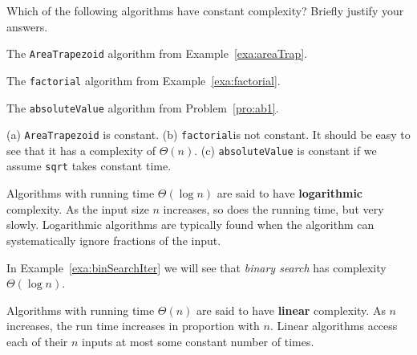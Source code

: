 \begin{exer}
Which of the following algorithms have constant complexity?   
Briefly justify your answers.
\begin{lenum}
\item
The \verb+AreaTrapezoid+ algorithm from Example~\ref{exa:areaTrap}.

\noindent
\answerlinetwo
\item
The \verb+factorial+ algorithm from Example~\ref{exa:factorial}.

\noindent
\answerlinetwo
\item 
The \verb+absoluteValue+ algorithm from Problem~\ref{pro:ab1}.

\noindent
\answerlinetwo
\end{lenum}
\begin{answer}
(a) \verb+AreaTrapezoid+ is constant.  
(b) \verb+factorial+is not constant.  
It should be easy to see that it has a complexity of $\Theta(n)$.
(c)  \verb+absoluteValue+ is constant if we assume \verb+sqrt+ takes constant time.
\end{answer}
\end{exer}

\begin{df}[Logarithmic]
Algorithms with running time $\Theta(\log n)$ are said to have {\bf logarithmic} complexity.
As the input size $n$ increases, so does the running time, but very slowly.
Logarithmic algorithms are typically found when the algorithm can systematically 
ignore fractions of the input.
\end{df}

\begin{exa}
In Example~\ref{exa:binSearchIter} we will see that 
{\em binary search} has complexity $\Theta(\log n)$. 
\end{exa}

\begin{df}[Linear]
Algorithms with running time $\Theta(n)$ are said to have {\bf linear} complexity.
As $n$ increases, the run time increases in proportion with $n$.
Linear algorithms access each of their $n$ inputs at most some constant number of times.
\end{df}

